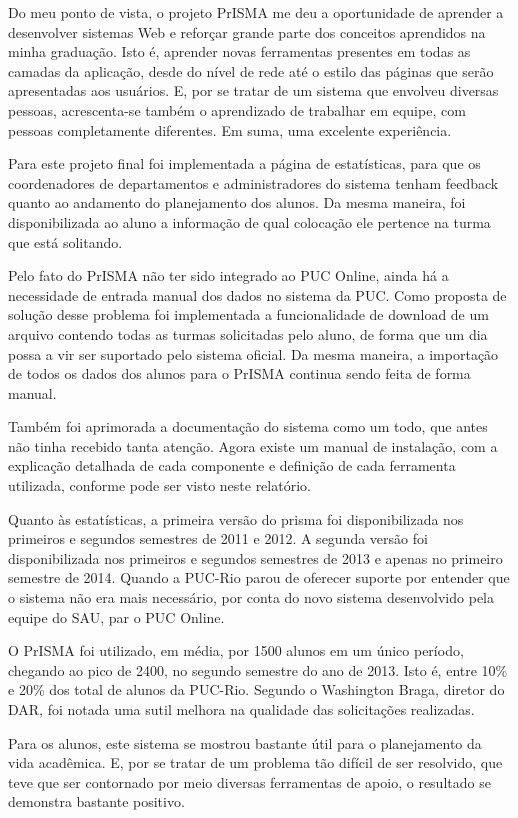 \documentclass[graduacao,brazil]{ThesisPUC}
\begin{document}
Do meu ponto de vista, o projeto PrISMA me deu a oportunidade de aprender a desenvolver sistemas Web e reforçar grande parte dos conceitos aprendidos na minha graduação. Isto é, aprender novas ferramentas presentes em todas as camadas da aplicação, desde do nível de rede até o estilo das páginas que serão apresentadas aos usuários. E, por se tratar de um sistema que envolveu diversas pessoas, acrescenta-se também o aprendizado de trabalhar em equipe, com pessoas completamente diferentes. Em suma, uma excelente experiência.

Para este projeto final foi implementada a página de estatísticas, para que os coordenadores de departamentos e administradores do sistema tenham feedback quanto ao andamento do planejamento dos alunos. Da mesma maneira, foi disponibilizada ao aluno a informação de qual colocação ele pertence na turma que está solitando.

Pelo fato do PrISMA não ter sido integrado ao PUC Online, ainda há a necessidade de entrada manual dos dados no sistema da PUC. Como proposta de solução desse problema foi implementada a funcionalidade de download de um arquivo contendo todas as turmas solicitadas pelo aluno, de forma que um dia possa a vir ser suportado pelo sistema oficial. Da mesma maneira, a importação de todos os dados dos alunos para o PrISMA continua sendo feita de forma manual.

Também foi aprimorada a documentação do sistema como um todo, que antes não tinha recebido tanta atenção. Agora existe um manual de instalação, com a explicação detalhada de cada componente e definição de cada ferramenta utilizada, conforme pode ser visto neste relatório.

Quanto às estatísticas, a primeira versão do prisma foi disponibilizada nos primeiros e segundos semestres de 2011 e 2012. A segunda versão foi disponibilizada nos primeiros e segundos semestres de 2013 e apenas no primeiro semestre de 2014. Quando a PUC-Rio parou de oferecer suporte por entender que o sistema não era mais necessário, por conta do novo sistema desenvolvido pela equipe do SAU, par o PUC Online.

O PrISMA foi utilizado, em média, por 1500 alunos em um único período, chegando ao pico de 2400, no segundo semestre do ano de 2013. Isto é, entre 10\% e 20\% dos total de alunos da PUC-Rio. Segundo o Washington Braga, diretor do DAR, foi notada uma sutil melhora na qualidade das solicitações realizadas.

Para os alunos, este sistema se mostrou bastante útil para o planejamento da vida acadêmica. E, por se tratar de um problema tão difícil de ser resolvido, que teve que ser contornado por meio diversas ferramentas de apoio, o resultado se demonstra bastante positivo.
\end{document}
